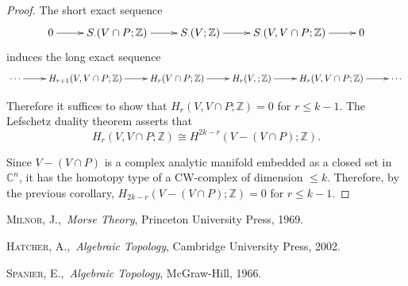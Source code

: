 \documentclass[a4paper,11pt,reqno]{amsart}
\newcommand{\ZZ}{\mathbb{Z}}      %
\newcommand{\CC}{\mathbb{C}}
\begin{document}
\begin{proof}
  The short exact sequence
  \begin{equation}
    \xymatrix{
      0 \ar[r] &
      S_{\cdot}(V\cap P;\ZZ) \ar[r] &
      S_{\cdot}(V;\ZZ) \ar[r] &
      S_{\cdot}(V, V\cap P;\ZZ) \ar[r] & 
      0
    }
  \end{equation}
  induces the long exact sequence
  \begin{equation}
    \xymatrix{
      \cdots \ar[r] &
      H_{r+1}(V, V\cap P;\ZZ) \ar[r] &
      H_{r}(V\cap P;\ZZ) \ar[r] &
      H_{r}(V,;\ZZ) \ar[r] & 
      H_{r}(V, V\cap P;\ZZ) \ar[r] &
      \cdots
    }
  \end{equation}
   
  Therefore it suffices to show that $H_r(V, V\cap P; \ZZ) = 0$ for $r \le
  k-1$. The Lefschetz duality theorem asserts that
  \begin{equation}
    H_r(V,V\cap P;\ZZ) \cong H^{2k-r}(V-(V\cap P);\ZZ).
  \end{equation}

  Since $V-(V\cap P)$ is a complex analytic manifold embedded as a closed set in
  $\CC^n$, it has the homotopy type of a CW-complex of dimension $\le
  k$. Therefore, by the previous corollary, $H_{2k-r}(V-(V\cap P);\ZZ) = 0$ for
  $r \le k-1$.
\end{proof}

\begin{thebibliography}{9}                                                                                                

 \textsc{Milnor, J.},\ \textit{Morse Theory}, Princeton University
  Press, 1969.

 \textsc{Hatcher, A.},\ \textit{Algebraic Topology}, Cambridge
  University Press, 2002.

 \textsc{Spanier, E.},\ \textit{Algebraic Topology}, McGraw-Hill,
  1966.

\end{thebibliography}
\end{document}
